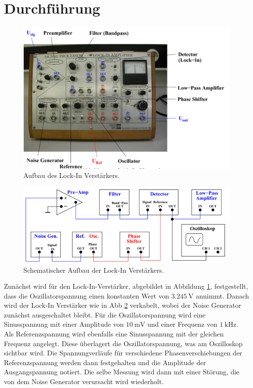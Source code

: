 \section{Durchführung}

\begin{figure}[H]
    \centering
    \includegraphics{Bilder/LockIn.png}
    \caption{Aufbau des Lock-In Verstärkers.\cite{V303}}
    \label{fig:LockIn}
\end{figure}
\begin{figure}[H]
    \centering
    \includegraphics{Bilder/LockInShema.png}
    \caption{Schematischer Aufbau der Lock-In Verstärkers. \cite{V303}}
    \label{fig:LockInSchema}
\end{figure}

\noindent 
Zunächst wird für den Lock-In-Verstärker, abgebildet in Abbildung \ref{fig:LockIn}, festgestellt, dass die Oszillatorspannung einen konstanten Wert von $\qty{3,245}{\volt}$ annimmt.
Danach wird der Lock-In Verstärker wie in Abb \ref{fig:LockInSchema} verkabelt, wobei der Noise Generator zunächst ausgeschaltet bleibt.
Für die Oszillatorspannung wird eine Sinusspannung mit einer Amplitude von $\qty{10}{\milli\volt}$ und einer Frequenz von 
$\qty{1}{\kilo\hertz}$. Als Referenzspannung wird ebenfalls eine Sinusspannung mit der gleichen Frequenz angelegt. Diese überlagert
die Oszillatorspannung, was am Oszilloskop sichtbar wird. Die Spannungverläufe für verschiedene Phasenverschiebungen der Referenzspannung
werden dann festgehalten und die Amplitude der Ausgangspannung notiert. Die selbe Messung wird dann mit einer Störung, die 
von dem Noise Generator verursacht wird wiederholt. \\

